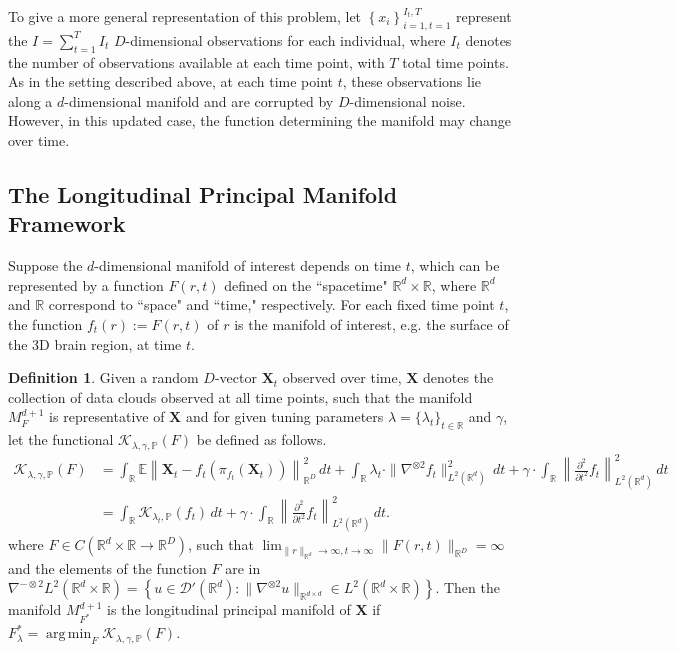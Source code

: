 \documentclass[11pt,reqno]{article}
\DeclareMathOperator*{\argmin}{arg\,min}
\theoremstyle{definition}
\newtheorem{definition}{Definition}
\begin{document}
To give a more general representation of this problem, let $\left\{x_i\right\}_{i=1, t=1}^{I_t, T}$ represent the $I = \sum_{t=1}^{T}I_t$ $D$-dimensional observations for each individual, where $I_t$ denotes the number of observations available at each time point, with $T$ total time points. As in the setting described above, at each time point $t$, these observations lie along a $d$-dimensional manifold and are corrupted by $D$-dimensional noise. However, in this updated case, the function determining the manifold may change over time.

\subsection{The Longitudinal Principal Manifold Framework}

Suppose the $d$-dimensional manifold of interest depends on time $t$, which can be represented by a function $F(r,t)$ defined on the ``spacetime" $\mathbb{R}^d\times\mathbb{R}$, where $\mathbb{R}^d$ and $\mathbb{R}$ correspond to ``space" and ``time," respectively. For each fixed time point $t$, the function $f_t(r):=F(r,t)$ of $r$ is the manifold of interest, e.g. the surface of the 3D brain region, at time $t$. 
\begin{definition}
  \label{def:lpme} Given a random $D$-vector $\boldsymbol{X}_t$ observed over time, $\boldsymbol{X}$ denotes the collection of data clouds observed at all time points, such that the manifold $M_F^{d+1}$ is representative of $\boldsymbol{X}$ and for given tuning parameters $\lambda=\{\lambda_t\}_{t\in\mathbb{R}}$ and $\gamma$, let the functional $\mathcal{K}_{\lambda, \gamma, \mathbb{P}}(F)$ be defined as follows. 
\begin{align}\label{eq:newKappa}
  \mathcal{K}_{\lambda, \gamma, \mathbb{P}}(F) &= \int_\mathbb{R} \mathbb{E}\left\|\boldsymbol{X}_t - f_t\left(\pi_{f_t}(\boldsymbol{X}_t)\right)\right\|_{\mathbb{R}^{D}}^2 \, dt + \int_\mathbb{R} \lambda_t \cdot\|\nabla^{\otimes 2}f_t\|_{L^2(\mathbb{R}^{d})}^2 \, dt + \gamma\cdot \int_{\mathbb{R}}\left\|\frac{\partial^2}{\partial t^2}f_t\right\|_{L^2(\mathbb{R}^d)}^2 \, dt \\
  &= \int_{\mathbb{R}}\mathcal{K}_{\lambda_t, \mathbb{P}}(f_t) \, dt + \gamma \cdot \int_{\mathbb{R}}\left\|\frac{\partial^2}{\partial t^2}f_t\right\|_{L^2(\mathbb{R}^d)}^2 \, dt. \nonumber
\end{align}
where $F \in C(\mathbb{R}^{d}\times\mathbb{R} \to \mathbb{R}^{D})$, such that $\lim_{\|r\|_{\mathbb{R}^{d}} \to \infty, t \to \infty}\|F(r,t)\|_{\mathbb{R}^{D}} = \infty$ and the elements of the function $F$ are in $\nabla^{-\otimes 2}L^2(\mathbb{R}^{d}\times\mathbb{R}) = \left\{u \in \mathcal{D}'(\mathbb{R}^{d}): \|\nabla^{\otimes 2} u\|_{\mathbb{R}^{d \times d}} \in L^2(\mathbb{R}^{d}\times\mathbb{R})\right\}$. Then the manifold $M_{F^{*}}^{d+1}$ is the longitudinal principal manifold of $\boldsymbol{X}$ if $F_{\lambda}^{*} = \argmin_{F}\mathcal{K}_{\lambda, \gamma, \mathbb{P}}(F)$.
\end{definition}
\end{document}
